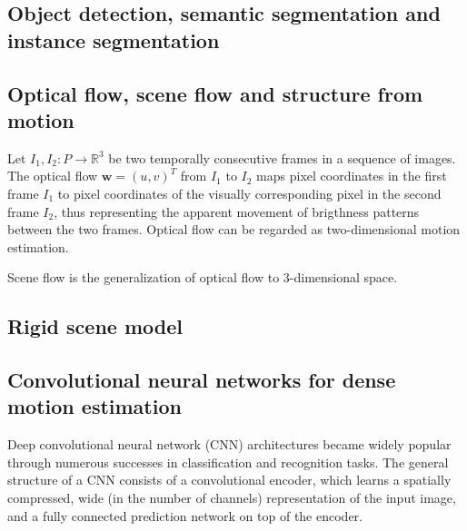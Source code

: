 
\subsection{Object detection, semantic segmentation and instance segmentation}

\subsection{Optical flow, scene flow and structure from motion}
Let $I_1,I_2 : P \to \mathbb{R}^3$ be two temporally consecutive frames in a sequence of images.
The optical flow $\mathbf{w} = (u, v)^T$ from $I_1$ to $I_2$ maps pixel coordinates in the first
frame $I_1$ to pixel coordinates of the visually corresponding pixel in the second frame $I_2$, thus
representing the apparent movement of brigthness patterns between the two frames.
Optical flow can be regarded as two-dimensional motion estimation.

Scene flow is the generalization of optical flow to 3-dimensional space.

\subsection{Rigid scene model}
\subsection{Convolutional neural networks for dense motion estimation}
Deep convolutional neural network (CNN) architectures \cite{} became widely popular
through numerous successes in classification and recognition tasks.
The general structure of a CNN consists of a convolutional encoder, which
learns a spatially compressed, wide (in the number of channels) representation of the input image,
and a fully connected prediction network on top of the encoder.

